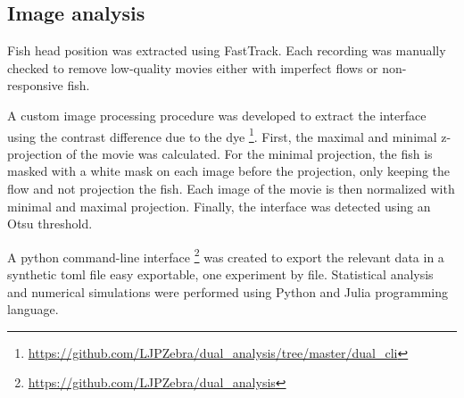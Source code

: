 \begin{appendices}
    \section{Image analysis}
    Fish head position was extracted using FastTrack. Each recording was manually checked to remove low-quality movies either with imperfect flows or non-responsive fish.

    A custom image processing procedure was developed to extract the interface using the contrast difference due to the dye \footnote{\url{https://github.com/LJPZebra/dual_analysis/tree/master/dual_cli}}. First, the maximal and minimal z-projection of the movie was calculated. For the minimal projection, the fish is masked with a white mask on each image before the projection, only keeping the flow and not projection the fish. Each image of the movie is then normalized with minimal and maximal projection. Finally, the interface was detected using an Otsu threshold.

    A python command-line interface \footnote{\url{https://github.com/LJPZebra/dual_analysis}} was created to export the relevant data in a synthetic toml file easy exportable, one experiment by file. Statistical analysis and numerical simulations were performed using Python and Julia programming language.


\end{appendices}
